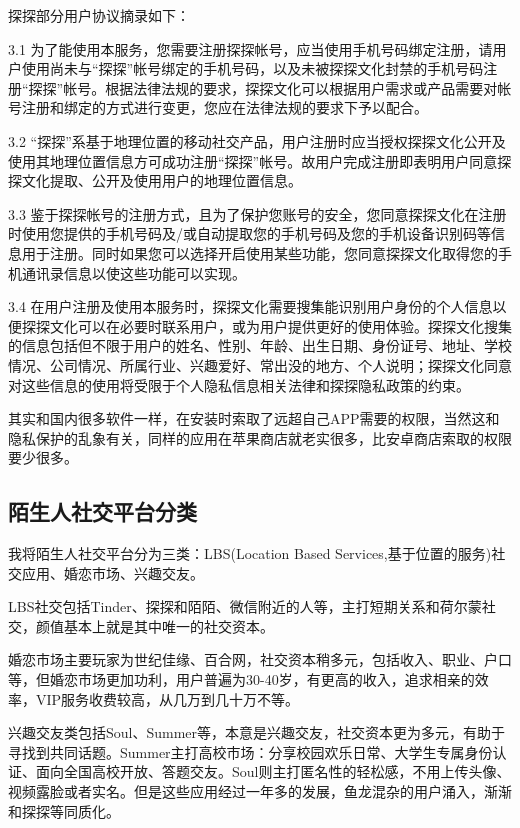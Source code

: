 \documentclass[UTF8]{ctexart}
\begin{document}
探探部分用户协议摘录如下：

\begin{tcolorbox}
    3.1 为了能使用本服务，您需要注册探探帐号，应当使用手机号码绑定注册，请用户使用尚未与“探探”帐号绑定的手机号码，以及未被探探文化封禁的手机号码注册“探探”帐号。根据法律法规的要求，探探文化可以根据用户需求或产品需要对帐号注册和绑定的方式进行变更，您应在法律法规的要求下予以配合。

    3.2 “探探”系基于地理位置的移动社交产品，用户注册时应当授权探探文化公开及使用其地理位置信息方可成功注册“探探”帐号。故用户完成注册即表明用户同意探探文化提取、公开及使用用户的地理位置信息。

    3.3 鉴于探探帐号的注册方式，且为了保护您账号的安全，您同意探探文化在注册时使用您提供的手机号码及/或自动提取您的手机号码及您的手机设备识别码等信息用于注册。同时如果您可以选择开启使用某些功能，您同意探探文化取得您的手机通讯录信息以使这些功能可以实现。

    3.4 在用户注册及使用本服务时，探探文化需要搜集能识别用户身份的个人信息以便探探文化可以在必要时联系用户，或为用户提供更好的使用体验。探探文化搜集的信息包括但不限于用户的姓名、性别、年龄、出生日期、身份证号、地址、学校情况、公司情况、所属行业、兴趣爱好、常出没的地方、个人说明；探探文化同意对这些信息的使用将受限于个人隐私信息相关法律和探探隐私政策的约束。\cite{MoMoAgreement}
\end{tcolorbox}

其实和国内很多软件一样，在安装时索取了远超自己APP需要的权限，当然这和隐私保护的乱象有关，同样的应用在苹果商店就老实很多，比安卓商店索取的权限要少很多。

\subsection{陌生人社交平台分类}
我将陌生人社交平台分为三类：LBS(Location Based Services,基于位置的服务)社交应用、婚恋市场、兴趣交友。

LBS社交包括Tinder、探探和陌陌、微信附近的人等，主打短期关系和荷尔蒙社交，颜值基本上就是其中唯一的社交资本。

婚恋市场主要玩家为世纪佳缘、百合网，社交资本稍多元，包括收入、职业、户口等，但婚恋市场更加功利，用户普遍为30-40岁，有更高的收入，追求相亲的效率，VIP服务收费较高，从几万到几十万不等。

兴趣交友类包括Soul、Summer等，本意是兴趣交友，社交资本更为多元，有助于寻找到共同话题。Summer主打高校市场：分享校园欢乐日常、大学生专属身份认证、面向全国高校开放、答题交友。Soul则主打匿名性的轻松感，不用上传头像、视频露脸或者实名。但是这些应用经过一年多的发展，鱼龙混杂的用户涌入，渐渐和探探等同质化。
\end{document}
